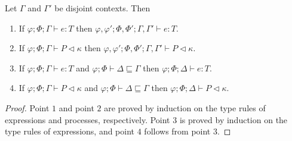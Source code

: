 %
\begin{lemma}[Weakening]\label{lemma:weakening}
Let $\Gamma$ and $\Gamma'$ be disjoint contexts. Then
\begin{enumerate}
    \item If $\varphi;\Phi;\Gamma\vdash e : T$ then $\varphi,\varphi';\Phi,\Phi';\Gamma,\Gamma'\vdash e : T$.
    \item If $\varphi;\Phi;\Gamma\vdash P \triangleleft \kappa$ then $\varphi,\varphi';\Phi,\Phi';\Gamma,\Gamma'\vdash P \triangleleft \kappa$.
    \item If $\varphi;\Phi;\Gamma\vdash e : T$ and $\varphi;\Phi\vdash \Delta \sqsubseteq \Gamma$ then $\varphi;\Phi;\Delta\vdash e : T$.
    \item If $\varphi;\Phi;\Gamma\vdash P \triangleleft \kappa$ and $\varphi;\Phi\vdash \Delta \sqsubseteq \Gamma$ then $\varphi;\Phi;\Delta\vdash P \triangleleft \kappa$.
\end{enumerate}
\begin{proof} Point $1$ and point $2$ are proved by induction on the type rules of expressions and processes, respectively. Point $3$ is proved by induction on the type rules of expressions, and point $4$ follows from point $3$.
\end{proof}
\end{lemma}

